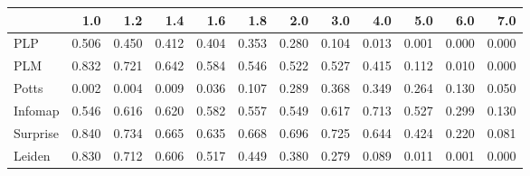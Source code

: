 \begin{tabular}{lrrrrrrrrrrr}
\toprule
{} &   1.0 &   1.2 &   1.4 &   1.6 &   1.8 &   2.0 &   3.0 &   4.0 &   5.0 &   6.0 &   7.0 \\
\midrule
PLP      & 0.506 & 0.450 & 0.412 & 0.404 & 0.353 & 0.280 & 0.104 & 0.013 & 0.001 & 0.000 & 0.000 \\
PLM      & 0.832 & 0.721 & 0.642 & 0.584 & 0.546 & 0.522 & 0.527 & 0.415 & 0.112 & 0.010 & 0.000 \\
Potts    & 0.002 & 0.004 & 0.009 & 0.036 & 0.107 & 0.289 & 0.368 & 0.349 & 0.264 & 0.130 & 0.050 \\
Infomap  & 0.546 & 0.616 & 0.620 & 0.582 & 0.557 & 0.549 & 0.617 & 0.713 & 0.527 & 0.299 & 0.130 \\
Surprise & 0.840 & 0.734 & 0.665 & 0.635 & 0.668 & 0.696 & 0.725 & 0.644 & 0.424 & 0.220 & 0.081 \\
Leiden   & 0.830 & 0.712 & 0.606 & 0.517 & 0.449 & 0.380 & 0.279 & 0.089 & 0.011 & 0.001 & 0.000 \\
\bottomrule
\end{tabular}
